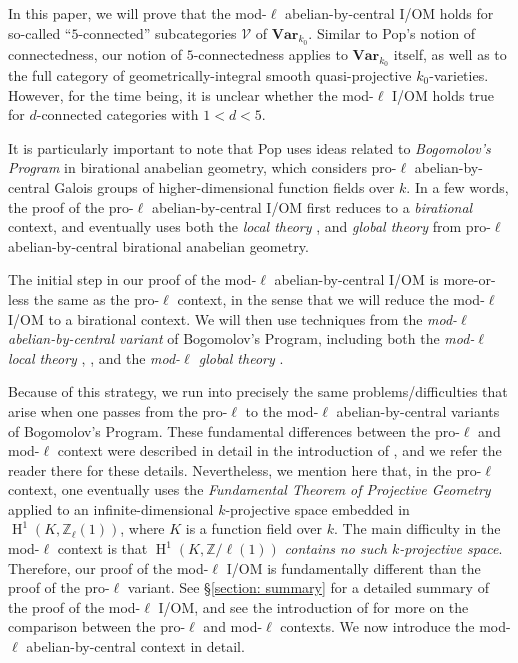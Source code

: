 \documentclass[11pt]{amsart}
\theoremstyle{definition}
\theoremstyle{remark}
\numberwithin{equation}{section}
\renewcommand{\H}{\operatorname{H}}
\newcommand{\Z}{\mathbb{Z}}
\newcommand{\Vc}{\mathcal{V}}
\newcommand{\Var}{\mathbf{Var}}
\begin{document}
In this paper, we will prove that the mod-$\ell$ abelian-by-central I/OM holds for so-called ``$5$-connected'' subcategories $\Vc$ of $\Var_{k_0}$.
Similar to {\sc Pop's} notion of connectedness, our notion of $5$-connectedness applies to $\Var_{k_0}$ itself, as well as to the full category of geometrically-integral smooth quasi-projective $k_0$-varieties.
However, for the time being, it is unclear whether the mod-$\ell$ I/OM holds true for $d$-connected categories with $1 < d < 5$.

It is particularly important to note that {\sc Pop} \cite{Pop:2014} uses ideas related to  \emph{Bogomolov's Program} \cite{Bogomolov:1991} in birational anabelian geometry, which considers pro-$\ell$ abelian-by-central Galois groups of higher-dimensional function fields over $k$.
In a few words, the proof of the pro-$\ell$ abelian-by-central I/OM first reduces to a \emph{birational} context, and eventually uses both the \emph{local theory} \cite{Bogomolov:2002}, \cite{Pop:2010} and \emph{global theory} \cite{Pop:2007} from pro-$\ell$ abelian-by-central birational anabelian geometry.

The initial step in our proof of the mod-$\ell$ abelian-by-central I/OM is more-or-less the same as the pro-$\ell$ context, in the sense that we will reduce the mod-$\ell$ I/OM to a birational context.
We will then use techniques from the \emph{mod-$\ell$ abelian-by-central variant} of Bogomolov's Program, including both the \emph{mod-$\ell$ local theory} \cite{Pop:2010a}, \cite{Topaz:2013a}, \cite{Topaz:2015} and the \emph{mod-$\ell$ global theory} \cite{Topaz:2014}.

Because of this strategy, we run into precisely the same problems/difficulties that arise when one passes from the pro-$\ell$ to the mod-$\ell$ abelian-by-central variants of Bogomolov's Program.
These fundamental differences between the pro-$\ell$ and mod-$\ell$ context were described in detail in the introduction of \cite{Topaz:2014}, and we refer the reader there for these details.
Nevertheless, we mention here that, in the pro-$\ell$ context, one eventually uses the \emph{Fundamental Theorem of Projective Geometry} applied to an infinite-dimensional $k$-projective space embedded in $\H^1(K,\Z_\ell(1))$, where $K$ is a function field over $k$.
The main difficulty in the mod-$\ell$ context is that $\H^1(K,\Z/\ell(1))$ \emph{contains no such $k$-projective space}.
Therefore, our proof of the mod-$\ell$ I/OM is fundamentally different than the proof of the pro-$\ell$ variant.
See \S\ref{section: summary} for a detailed summary of the proof of the mod-$\ell$ I/OM, and see the introduction of \cite{Topaz:2014} for more on the comparison between the pro-$\ell$ and mod-$\ell$ contexts.
We now introduce the mod-$\ell$ abelian-by-central context in detail.
\end{document}
